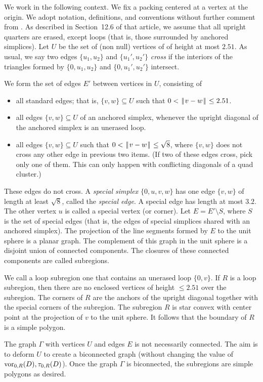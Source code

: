 \documentclass[11pt]{amsart}
\def\op#1{{\text{#1}}}
\def\text{\hbox}
\def\|{{\hskip0.1em|\hskip-0.15em|\hskip0.1em}}
\let\subset=\subseteq
\begin{document}
We work in the following context.  We fix a packing centered at a vertex at the origin.
We adopt notation, definitions, and conventions without further comment
from \cite{Hales:2006:DCG}.  
As described in Section~12.6 of that article, we assume that all upright quarters
are erased, except loops (that is, those surrounded by anchored simplices).    
Let $U$ be the set of (non null) vertices of of height at most $2.51$.  As usual, we say two edges $\{u_1,u_2\}$ and $\{u_1',u_2'\}$ {\it cross}
if the interiors of the triangles formed by $\{0,u_1,u_2\}$ and $\{0,u_1',u_2'\}$ intersect.

We form the set of edges $E'$ between vertices in $U$, consisting of
\begin{itemize}
\item all standard edges; that is, $\{v,w\}\subset U$ such that $0<\|v-w\|\le 2.51$.
\item all edges $\{v,w\}\subset U$ of an anchored simplex, whenever the upright diagonal of the anchored simplex is an unerased loop.
\item all edges $\{v,w\}\subset U$ such that $0<\|v-w\|\le\sqrt8$, where $\{v,w\}$ does not cross any other edge in previous two items.  (If two of these edges cross, pick only one of them. This can only happen with conflicting diagonals
of a quad cluster.)
\end{itemize}
These edges do not cross.  A {\it special simplex} $\{0,u,v,w\}$ has one edge $\{v,w\}$ of length at least $\sqrt8$,
called the {\it special edge}.  
A special edge has length at most $3.2$.
The other vertex $u$ is called a special vertex (or corner).
Let $E=E'\setminus S$, where $S$ is the set of special edges (that
is, the edges of special simplices shared with an anchored simplex).
 The projection of the line segments formed by $E$ to the
unit sphere is a planar graph.
The complement of this graph in the unit sphere
is a disjoint union of connected components.  The closures of these connected components are called subregions.

We call a loop subregion one that contains an unerased loop $\{0,v\}$.
If $R$ is a loop subregion, then there are no enclosed vertices of height $\le 2.51$ over the
subregion.  The corners of $R$ are the anchors of the upright diagonal together with the special corners
of the subregion.  The subregion $R$ is star convex with center point at the projection of $v$ to the unit sphere.
It follows that the boundary of $R$ is a simple polygon.

The graph $\Gamma$ with vertices $U$ and edges $E$ is not necessarily connected.  The aim is to deform
$U$ to create a biconnected graph (without changing the value of $\op{vor}_{0,R}(D),\tau_{0,R}(D)$).  Once the graph $\Gamma$
is biconnected, the subregions are simple polygons as desired.
\end{document}
